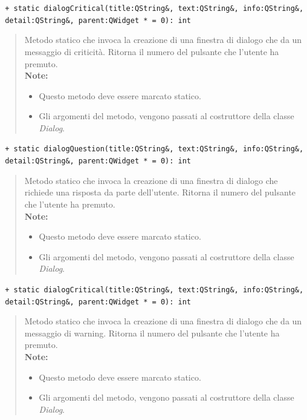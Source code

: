\color{blue}\verb! + static dialogCritical(title:QString&, text:QString&, info:QString&,! \\ \verb! detail:QString&, parent:QWidget * = 0): int!
\color{black}
\begin{quote}
Metodo statico che invoca la creazione di una finestra di dialogo che da un messaggio di criticità. Ritorna il numero del pulsante che l'utente ha premuto. \\
\textbf{Note:}
\begin{itemize}
\item Questo metodo deve essere marcato statico.
\item Gli argomenti del metodo, vengono passati al costruttore della classe \emph{Dialog}.
\end{itemize}
\end{quote}
\color{blue}\verb! + static dialogQuestion(title:QString&, text:QString&, info:QString&,! \\ \verb! detail:QString&, parent:QWidget * = 0): int!
\color{black}
\begin{quote}
Metodo statico che invoca la creazione di una finestra di dialogo che richiede una risposta da parte dell'utente. Ritorna il numero del pulsante che l'utente ha premuto. \\
\textbf{Note:}
\begin{itemize}
\item Questo metodo deve essere marcato statico.
\item Gli argomenti del metodo, vengono passati al costruttore della classe \emph{Dialog}.
\end{itemize}
\end{quote}
\color{blue}\verb! + static dialogCritical(title:QString&, text:QString&, info:QString&,! \\ \verb! detail:QString&, parent:QWidget * = 0): int!
\color{black}
\begin{quote}
Metodo statico che invoca la creazione di una finestra di dialogo che da un messaggio di warning. Ritorna il numero del pulsante che l'utente ha premuto. \\
\textbf{Note:}
\begin{itemize}
\item Questo metodo deve essere marcato statico.
\item Gli argomenti del metodo, vengono passati al costruttore della classe \emph{Dialog}.
\end{itemize}
\end{quote}
\pagebreak
